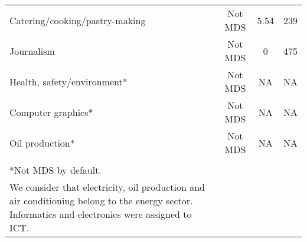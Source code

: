 {\begin{longtable}{m{9cm}ccc}
Catering/cooking/pastry-making&Not MDS&5.54&239\\
Journalism&Not MDS&0&475\\
Health, safety/environment*&Not MDS&NA&NA\\
Computer graphics*&Not MDS&NA&NA\\
Oil production*&Not MDS&NA&NA\\
\midrule
\begin{minipage}{17cm}
\small{
{\textit Notes:} \\
*Not MDS   by default. \\
We consider that electricity, oil production and air conditioning
belong to  the energy sector. Informatics and electronics
were assigned to ICT.
}
\end{minipage} \\* \bottomrule
\end{longtable}
}
